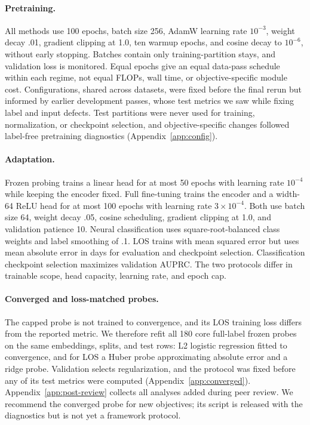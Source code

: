 \paragraph{Pretraining.}
All methods use 100 epochs, batch size 256, AdamW learning rate $10^{-3}$, weight decay .01, gradient clipping at 1.0, ten warmup epochs, and cosine decay to $10^{-6}$, without early stopping. Batches contain only training-partition stays, and validation loss is monitored. Equal epochs give an equal data-pass schedule within each regime, not equal FLOPs, wall time, or objective-specific module cost. Configurations, shared across datasets, were fixed before the final rerun but informed by earlier development passes, whose test metrics we saw while fixing label and input defects. Test partitions were never used for training, normalization, or checkpoint selection, and objective-specific changes followed label-free pretraining diagnostics (Appendix~\ref{app:config}).

\paragraph{Adaptation.}
Frozen probing trains a linear head for at most 50 epochs with learning rate $10^{-4}$ while keeping the encoder fixed. Full fine-tuning trains the encoder and a width-64 ReLU head for at most 100 epochs with learning rate $3\times10^{-4}$. Both use batch size 64, weight decay .05, cosine scheduling, gradient clipping at 1.0, and validation patience 10. Neural classification uses square-root-balanced class weights and label smoothing of .1. LOS trains with mean squared error but uses mean absolute error in days for evaluation and checkpoint selection. Classification checkpoint selection maximizes validation AUPRC. The two protocols differ in trainable scope, head capacity, learning rate, and epoch cap.

\paragraph{Converged and loss-matched probes.}
The capped probe is not trained to convergence, and its LOS training loss differs from the reported metric. We therefore refit all 180 core full-label frozen probes on the same embeddings, splits, and test rows: L2 logistic regression fitted to convergence, and for LOS a Huber probe approximating absolute error and a ridge probe. Validation selects regularization, and the protocol was fixed before any of its test metrics were computed (Appendix~\ref{app:converged}). Appendix~\ref{app:post-review} collects all analyses added during peer review. We recommend the converged probe for new objectives; its script is released with the diagnostics but is not yet a framework protocol.


